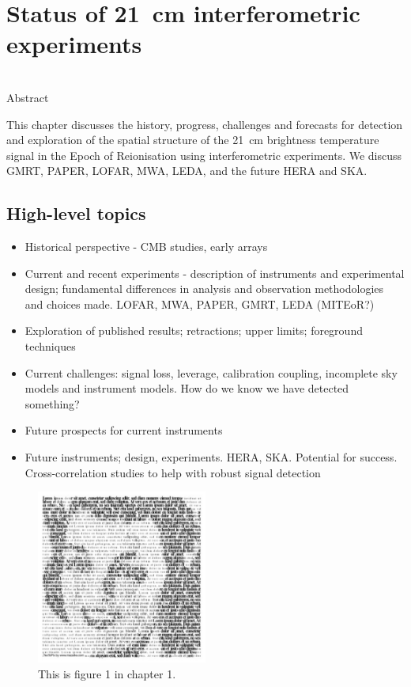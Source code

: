 \chapter{Status of 21~cm interferometric experiments}

\begin{bf}
  \author{Cathryn M. Trott (ICRAR-Curtin), Jonathan Pober (Brown University)}\\
  
Abstract\\
\end{bf}

This chapter discusses the history, progress, challenges and forecasts for detection and exploration of the spatial structure of the 21~cm brightness temperature signal in the Epoch of Reionisation using interferometric experiments. We discuss GMRT, PAPER, LOFAR, MWA, LEDA, and the future HERA and SKA.


\section{High-level topics}

\begin{itemize}
\item Historical perspective - CMB studies, early arrays
\item Current and recent experiments - description of instruments and experimental design; fundamental differences in analysis and observation methodologies and choices made. LOFAR, MWA, PAPER, GMRT, LEDA (MITEoR?)
\item Exploration of published results; retractions; upper limits; foreground techniques
\item Current challenges: signal loss, leverage, calibration coupling, incomplete sky models and instrument models. How do we know we have detected something?
\item Future prospects for current instruments
\item Future instruments; design, experiments. HERA, SKA. Potential for success. Cross-correlation studies to help with robust signal detection
\end{itemize}



\begin{figure}[]
\begin{center}
\includegraphics[width=0.5\textwidth]{Trott_Pober/01x01-eps-converted-to}
\end{center}
\caption{This is figure 1 in chapter 1.}
\end{figure}

